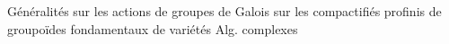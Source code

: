 Généralités sur les actions de groupes de Galois sur les compactifiés profinis de groupoïdes fondamentaux de variétés Alg. complexes

